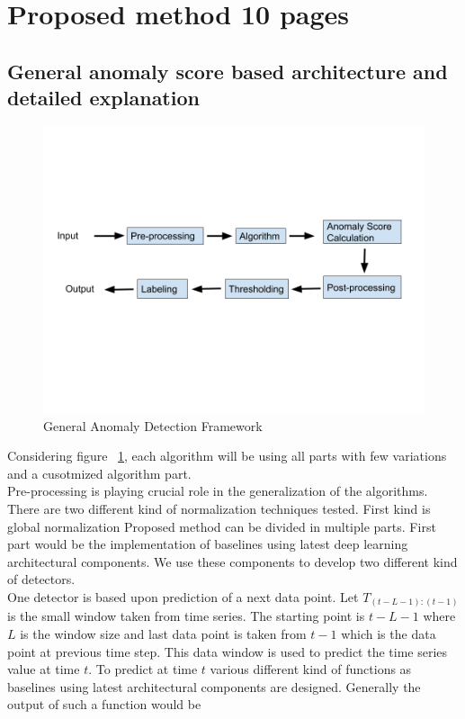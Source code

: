 \documentclass[12pt]{article}
\begin{document}
\section{Proposed method 10 pages}
\subsection{General anomaly score based architecture and detailed explanation}
\begin{figure}
\centering
        \includegraphics[width=\textwidth]{images/generalAnomalyDetectionFrameWork.png}
    \caption{General Anomaly Detection Framework}
    \label{generalAnomalyDetectionFrameWork}
\end{figure}
Considering figure ~\ref{generalAnomalyDetectionFrameWork}, each algorithm will be using  
all parts with few variations and a cusotmized algorithm part.\\
\break
Pre-processing is playing crucial role in the generalization of the algorithms. There are two different kind of normalization techniques tested. First kind is global normalization
Proposed method can be divided in multiple parts. First part would be the implementation of baselines using latest deep learning architectural components. We use these components to develop two different kind of detectors.\\
\break
One detector is based upon prediction of a next data point. Let $T_{(t-L-1):(t-1)}$ is the small window taken from time series. The starting point is $t-L-1$ where $L$ is the window size and last data point is taken from $t-1$ which is the data point at previous time step. This data window is used to predict the time series value at time $t$. To predict at time $t$ various different kind of functions as baselines using latest architectural components are designed. Generally the output of such a function would be
\end{document}
